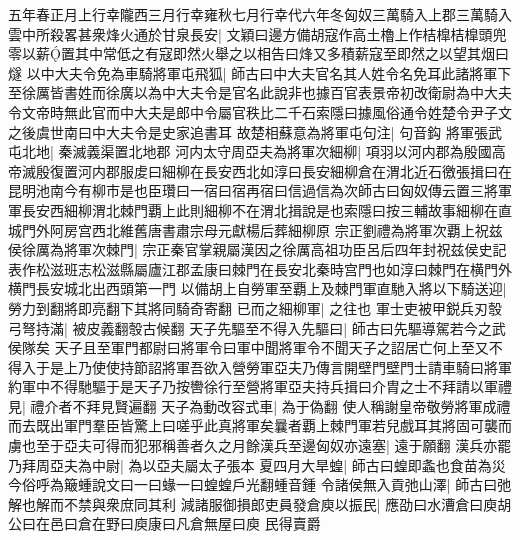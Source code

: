 五年春正月上行幸隴西三月行幸雍秋七月行幸代六年冬匈奴三萬騎入上郡三萬騎入雲中所殺畧甚衆烽火通於甘泉長安|{
	文穎曰邊方備胡寇作高土櫓上作桔橰桔橰頭兜零以薪置其中常低之有寇即然火舉之以相告曰烽又多積薪寇至即然之以望其烟曰燧}
以中大夫令免為車騎將軍屯飛狐|{
	師古曰中大夫官名其人姓令名免耳此諸將軍下至徐厲皆書姓而徐廣以為中大夫令是官名此說非也據百官表景帝初改衛尉為中大夫令文帝時無此官而中大夫是郎中令屬官秩比二千石索隱曰據風俗通令姓楚令尹子文之後虞世南曰中大夫令是史家追書耳}
故楚相蘇意為將軍屯句注|{
	句音鈎}
將軍張武屯北地|{
	秦滅義渠置北地郡}
河内太守周亞夫為將軍次細柳|{
	項羽以河内郡為殷國高帝滅殷復置河内郡服䖍曰細柳在長安西北如淳曰長安細柳倉在渭北近石徼張揖曰在昆明池南今有柳市是也臣瓚曰一宿曰宿再宿曰信過信為次師古曰匈奴傳云置三將軍軍長安西細柳渭北棘門覇上此則細柳不在渭北揖說是也索隱曰按三輔故事細柳在直城門外阿房宫西北維舊唐書肅宗母元獻楊后葬細柳原}
宗正劉禮為將軍次覇上祝兹侯徐厲為將軍次棘門|{
	宗正秦官掌親屬漢因之徐厲高祖功臣呂后四年封祝兹侯史記表作松滋班志松滋縣屬廬江郡孟康曰棘門在長安北秦時宫門也如淳曰棘門在横門外横門長安城北出西頭第一門}
以備胡上自勞軍至覇上及棘門軍直馳入將以下騎送迎|{
	勞力到翻將即亮翻下其將同騎奇寄翻}
已而之細柳軍|{
	之往也}
軍士吏被甲鋭兵刃彀弓弩持滿|{
	被皮義翻彀古候翻}
天子先驅至不得入先驅曰|{
	師古曰先驅導駕若今之武侯隊矣}
天子且至軍門都尉曰將軍令曰軍中聞將軍令不聞天子之詔居亡何上至又不得入于是上乃使使持節詔將軍吾欲入營勞軍亞夫乃傳言開壁門壁門士請車騎曰將軍約軍中不得馳驅于是天子乃按轡徐行至營將軍亞夫持兵揖曰介胄之士不拜請以軍禮見|{
	禮介者不拜見賢遍翻}
天子為動改容式車|{
	為于偽翻}
使人稱謝皇帝敬勞將軍成禮而去既出軍門羣臣皆驚上曰嗟乎此真將軍矣曩者覇上棘門軍若兒戲耳其將固可襲而虜也至于亞夫可得而犯邪稱善者久之月餘漢兵至邊匈奴亦遠塞|{
	遠于願翻}
漢兵亦罷乃拜周亞夫為中尉|{
	為以亞夫屬太子張本}
夏四月大旱蝗|{
	師古曰蝗即螽也食苗為災今俗呼為簸蝩說文曰一曰蝝一曰蝗蝗戶光翻蝩音鍾}
令諸侯無入貢弛山澤|{
	師古曰弛解也解而不禁與衆庶同其利}
減諸服御損郎吏員發倉庾以振民|{
	應劭曰水漕倉曰庾胡公曰在邑曰倉在野曰庾康曰凡倉無屋曰庾}
民得賣爵


